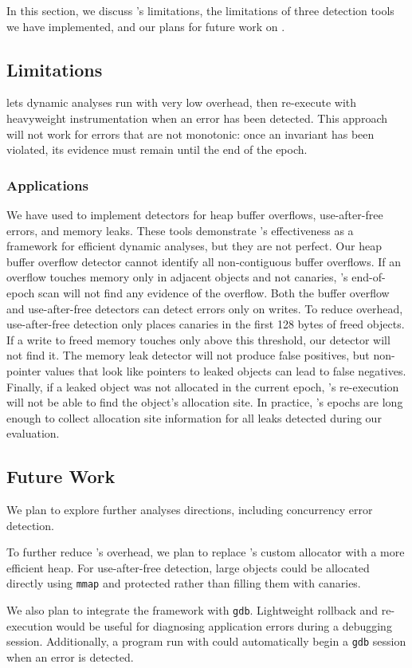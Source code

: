 In this section, we discuss \doubletake{}'s limitations, the limitations of three detection tools we have implemented, and our plans for future work on \doubletake{}.

\subsection{Limitations}

\doubletake{} lets dynamic analyses run with very low overhead, then
re-execute with heavyweight instrumentation when an error has been
detected. This approach will not work for errors that are not
monotonic: once an invariant has been violated, its evidence must remain until the end of the epoch.

\subsubsection*{Applications}
We have used \doubletake{} to implement detectors for heap buffer
overflows, use-after-free errors, and memory leaks. These tools
demonstrate \doubletake{}'s effectiveness as a framework for efficient
dynamic analyses, but they are not perfect. Our heap buffer overflow
detector cannot identify all non-contiguous buffer overflows. If an
overflow touches memory only in adjacent objects and not
canaries, \doubletake{}'s end-of-epoch scan will not find any evidence
of the overflow. Both the buffer overflow and use-after-free detectors
can detect errors only on writes. To reduce overhead, use-after-free
detection only places canaries in the first 128 bytes of freed
objects. If a write to freed memory touches only above this threshold,
our detector will not find it. The memory leak detector will not
produce false positives, but non-pointer values that look like
pointers to leaked objects can lead to false negatives. Finally, if a
leaked object was not allocated in the current epoch, \doubletake{}'s
re-execution will not be able to find the object's allocation site. In
practice, \doubletake{}'s epochs are long enough to collect allocation
site information for all leaks detected during our evaluation.
 
\subsection{Future Work}
We plan to explore further analyses directions, including concurrency error detection.

To further reduce \doubletake{}'s overhead, we plan to
replace \doubletake{}'s custom allocator with a more efficient
heap. For use-after-free detection, large objects could be allocated
directly using \texttt{mmap} and protected rather than filling them
with canaries.

We also plan to integrate the \doubletake{} framework
with \texttt{gdb}. Lightweight rollback and re-execution would be
useful for diagnosing application errors during a debugging
session. Additionally, a program run with \doubletake{} could
automatically begin a \texttt{gdb} session when an error is detected.
